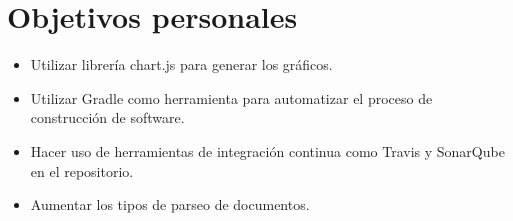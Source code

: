 \section{Objetivos personales}\label{objetivos-personales}

\begin{itemize}
	\tightlist
	\item
	Utilizar librería chart.js para generar los gráficos.
	\item
	Utilizar Gradle como herramienta para automatizar el proceso de
	construcción de software.
	\item
	Hacer uso de herramientas de integración continua como Travis y
	SonarQube en el repositorio.
	\item
	Aumentar los tipos de parseo de documentos.
	
\end{itemize}

